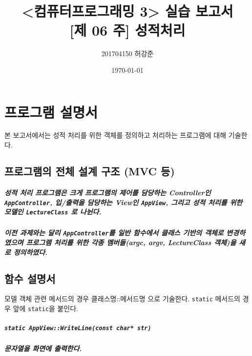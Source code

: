 \documentclass[UTF8]{report}
\title{%
    <컴퓨터프로그래밍 3> 실습 보고서 \\ 
    \large [제 06 주] 성적처리}
\author{201704150 허강준}
\date{\today}
\begin{document}
    \maketitle
    \tableofcontents

    \chapter{프로그램 설명서}
        본 보고서에서는 성적 처리를 위한 객체를 정의하고 처리하는 프로그램에 대해 기술한다.

        \section{프로그램의 전체 설계 구조 (MVC 등)}
            
            \paragraph{%
                \normalfont 성적 처리 프로그램은 크게 프로그램의 제어를 담당하는 Controller인 \texttt{AppController}, 입/출력을 담당하는 View인 \texttt{AppView}, 그리고 성적 처리를 위한 모델인 \texttt{LectureClass} 로 나뉜다.
            }

            \paragraph{%
                \normalfont 이전 과제와는 달리 \texttt{AppController}를 일반 함수에서 클래스 기반의 객체로 변경하였으며 프로그램 처리를 위한 각종 멤버들(argc, argv, LectureClass 객체)을 새로 정의하였다.
            }
            
        \section{함수 설명서}

            모델 객체 관련 메서드의 경우 클래스명::메서드명 으로 기술한다. \texttt{static} 메서드의 경우 앞에 \texttt{static}을 붙인다.
            
            \paragraph{\texttt{static AppView::WriteLine(const char* str)}}
            \paragraph{%
                \normalfont 문자열을 화면에 출력한다.
            }
\end{document}
